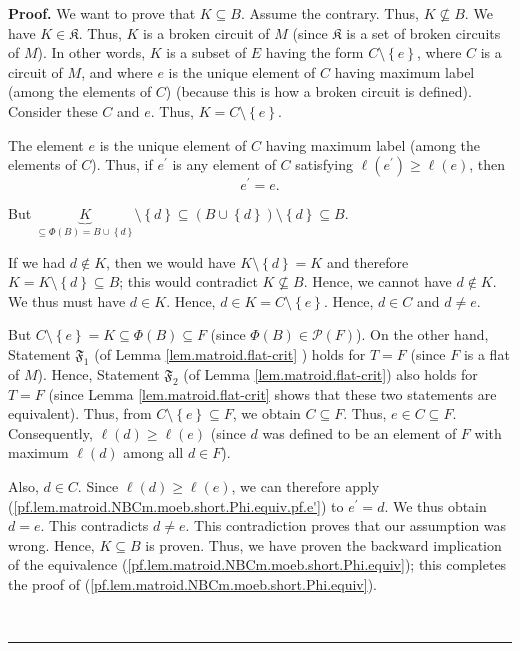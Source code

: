 \documentclass[numbers=enddot,12pt,final,onecolumn,notitlepage]{scrartcl}%
\theoremstyle{definition}
\newenvironment{proof}[1][Proof]{\noindent\textbf{#1.} }{\ \rule{0.5em}{0.5em}}
\begin{document}
\begin{proof}
We want to prove that $K\subseteq B$. Assume the contrary. Thus,
$K\not \subseteq B$. We have $K\in\mathfrak{K}$. Thus, $K$ is a broken circuit
of $M$ (since $\mathfrak{K}$ is a set of broken circuits of $M$). In other
words, $K$ is a subset of $E$ having the form $C\setminus\left\{  e\right\}
$, where $C$ is a circuit of $M$, and where $e$ is the unique element of $C$
having maximum label (among the elements of $C$) (because this is how a broken
circuit is defined). Consider these $C$ and $e$. Thus, $K=C\setminus\left\{
e\right\}  $.

The element $e$ is the unique element of $C$ having maximum label
(among the elements of $C$). Thus, if $e^{\prime}$ is any element of $C$
satisfying $\ell\left(  e^{\prime}\right)  \geq\ell\left(  e\right)  $, then%
\begin{equation}
e^{\prime}=e. \label{pf.lem.matroid.NBCm.moeb.short.Phi.equiv.pf.e'}%
\end{equation}


But $\underbrace{K}_{\subseteq\Phi\left(  B\right)  =B\cup\left\{  d\right\}
}\setminus\left\{  d\right\}  \subseteq\left(  B\cup\left\{  d\right\}
\right)  \setminus\left\{  d\right\}  \subseteq B$.

If we had $d\notin K$, then we would have $K\setminus\left\{  d\right\}  =K$
and therefore $K=K\setminus\left\{  d\right\}  \subseteq B$; this would
contradict $K\not \subseteq B$. Hence, we cannot have $d\notin K$. We thus
must have $d\in K$. Hence, $d\in K=C\setminus\left\{  e\right\}  $. Hence,
$d\in C$ and $d\neq e$.

But $C\setminus\left\{  e\right\}  =K\subseteq\Phi\left(  B\right)  \subseteq
F$ (since $\Phi\left(  B\right)  \in\mathcal{P}\left(  F\right)  $). On the
other hand, Statement $\mathfrak{F}_{1}$ (of Lemma \ref{lem.matroid.flat-crit}%
) holds for $T=F$ (since $F$ is a flat of $M$). Hence, Statement
$\mathfrak{F}_{2}$ (of Lemma \ref{lem.matroid.flat-crit}) also holds for $T=F$
(since Lemma \ref{lem.matroid.flat-crit} shows that these two statements are
equivalent). Thus, from $C\setminus\left\{  e\right\}  \subseteq F$, we obtain
$C\subseteq F$. Thus, $e\in C\subseteq F$. Consequently, $\ell\left(
d\right)  \geq\ell\left(  e\right)  $ (since $d$ was defined to be an element
of $F$ with maximum $\ell\left(  d\right)  $ among all $d\in F$).

Also, $d\in C$. Since $\ell\left(  d\right)  \geq\ell\left(  e\right)  $, we
can therefore apply (\ref{pf.lem.matroid.NBCm.moeb.short.Phi.equiv.pf.e'}) to
$e^{\prime}=d$. We thus obtain $d=e$. This contradicts $d\neq e$. This
contradiction proves that our assumption was wrong. Hence, $K\subseteq B$ is
proven. Thus, we have proven the backward implication of the equivalence
(\ref{pf.lem.matroid.NBCm.moeb.short.Phi.equiv}); this completes the proof of
(\ref{pf.lem.matroid.NBCm.moeb.short.Phi.equiv}).


\end{proof}
\end{document}
